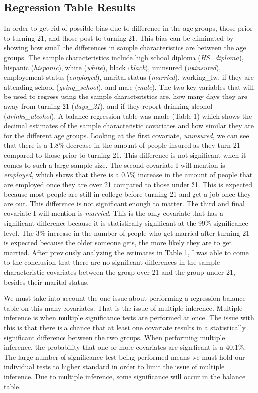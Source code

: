 \documentclass[a4paper]{article}
\begin{document}
\subsection{Regression Table Results}
In order to get rid of possible bias due to difference in the age groups, those prior to turning 21, and those post to turning 21. This bias can be eliminated by showing how small the differences in sample characteristics are between the age groups. The sample characteristics include high school diploma (\textit{HS\_diploma}), hispanic (\textit{hispanic}), white (\textit{white}), black (\textit{black}), uninsured (\textit{uninsured}), employement status (\textit{employed}), marital status (\textit{married}), working\_lw, if they are attending school (\textit{going\_school}), and male (\textit{male}). The two key variables that will be used to regress using the sample characteristics are, how many days they are away from turning 21 (\textit{days\_21}), and if they report drinking alcohol (\textit{drinks\_alcohol}). A balance regression table was made (Table 1) which shows the decimal estimates of the sample characteristic covariates and how similar they are for the different age groups. Looking at the first covariate, \textit{uninsured}, we can see that there is a 1.8\% decrease in the amount of people insured as they turn 21 compared to those prior to turning 21. This difference is not significant when it comes to such a large sample size. The second covariate I will mention is \textit{employed}, which shows that there is a 0.7\% increase in the amount of people that are employed once they are over 21 compared to those under 21. This is expected because most people are still in college before turning 21 and get a job once they are out. This difference is not significant enough to matter. The third and final covariate I will mention is \textit{married}. This is the only covariate that has a significant difference because it is statistically significant at the 99\% significance level. The 3\% increase in the number of people who get married after turning 21 is expected because the older someone gets, the more likely they are to get married. After previously analyzing the estimates in Table 1, I was able to come to the conclusion that there are no significant differences in the sample characteristic covariates between the group over 21 and the group under 21, besides their marital status.
\par
We must take into account the one issue about performing a regression balance table on this many covariates. That is the issue of multiple inference. Multiple inference is when multiple significance tests are performed at once. The issue with this is that there is a chance that at least one covariate results in a statistically significant difference between the two groups. When performing multiple inference, the probability that one or more covariates are significant is a 40.1\%. The large number of significance test being performed means we must hold our individual tests to higher standard in order to limit the issue of multiple inference. Due to multiple inference, some significance will occur in the balance table. 
\end{document}
